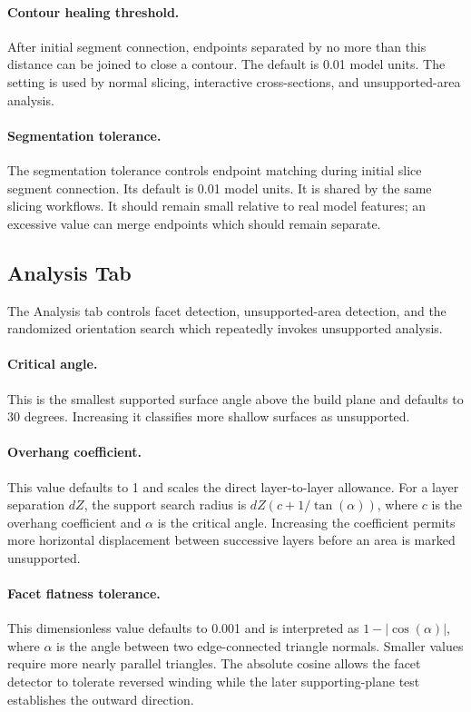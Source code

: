\paragraph{Contour healing threshold.}
After initial
segment connection, endpoints separated by no more than this distance can be
joined to close a contour. The default is 0.01 model units. The setting is
used by normal slicing, interactive cross-sections, and unsupported-area analysis.

\paragraph{Segmentation tolerance.}
The segmentation tolerance controls endpoint matching during initial slice
segment connection. Its default is 0.01 model units. It is shared by the
same slicing workflows. It should remain small relative to real model features;
an excessive value can merge endpoints which should remain separate.

\subsection{Analysis Tab}
\label{settings-analysis}

The Analysis tab controls facet detection, unsupported-area detection, and the
randomized orientation search which repeatedly invokes unsupported analysis.

\paragraph{Critical angle.}
This is the smallest supported surface angle above the build plane and defaults
to 30 degrees. Increasing it classifies more shallow surfaces as unsupported.

\paragraph{Overhang coefficient.}
This value defaults to 1 and scales the direct layer-to-layer allowance. For a
layer separation \(dZ\),
the support search radius is
\(dZ (c + 1 / \tan(\alpha))\), where \(c\) is the overhang coefficient and
\(\alpha\) is the critical angle. Increasing the coefficient permits more
horizontal displacement between successive layers before an area is marked
unsupported.

\paragraph{Facet flatness tolerance.}
This dimensionless value defaults to 0.001 and is interpreted as
\(1 - |\cos(\alpha)|\), where \(\alpha\) is the angle between
two edge-connected triangle normals. Smaller values require more nearly
parallel triangles. The absolute cosine allows the facet detector to tolerate
reversed winding while the later supporting-plane test establishes the outward
direction.
